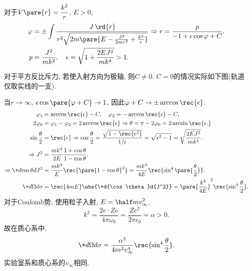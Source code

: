 \documentclass{ctexart}
\begin{document}
对于$\displaystyle V\pare{r} = \frac{k^2}{r}$, $E>0$,
\begin{align*}
    \varphi &= \pm \int \frac{J\,\rd{r}}{r^2\sqrt{2m\pare{E - \frac{J^2}{2mr^2} + \frac{k^2}{r}}}} \Rightarrow r = \frac{p}{-1 + \epsilon \cos\varphi + C}.\\
    p &= \frac{J^2}{mk^2},\quad \epsilon = \sqrt{1+\frac{2EJ^2}{mk^4}} > 1.
\end{align*}
\begin{remark}
    对于平方反比斥力, 若使入射方向为极轴, 则$C\neq 0$. $C=0$的情况实际如下图(轨道仅取实线的一支). 
    \begin{center}
    \end{center}
\end{remark}

当$r\rightarrow\infty$, $\epsilon\cos\pare{\varphi+C}\rightarrow 1$, 因此$\varphi+C \rightarrow \pm\displaystyle \arccos \rec{\epsilon}$.
\begin{align*}
    \varphi_1 &= \arccos \rec{\epsilon} - C,\quad \varphi_2 = -\arccos \rec{\epsilon} - C, \\
    2\varphi_0 &= \varphi_1 - \varphi_2 = 2\arccos \rec{\epsilon}\Rightarrow \theta = \pi - 2\varphi_0 = 2 \arcsin \rec{\epsilon.} \\
    \sin \frac{\theta}{2} &= \rec{\epsilon} \Rightarrow \cos \frac{\theta}{2} = \frac{\sqrt{1-\rec{\epsilon^2}}}{1/\epsilon} = \sqrt{\epsilon^2 - 1} = \sqrt{\frac{2EJ^2}{mk^4}}.\\
    \Rightarrow J^2 &= \frac{mk^4}{2E} \frac{1+\cos\theta}{1-\cos\theta}, \\
    \Rightarrow \+d{\cos\theta}d{J^2} &= \frac{mk^4}{E}\rec{\pare{1-\cos\theta}^2} = \frac{mk^4}{4E} \rec{\sin^4\pare{\frac{\theta}{2}}}. \\
    \+d\Omega d\sigma &= \rec{4mE}\abs{\+d{\cos\theta}d{J^2}} = \pare{\frac{k^4}{4E}}^2 \rec{\sin^4 \frac{\theta}{2}}.
\end{align*}
对于Coulomb势, 使用粒子入射, $\displaystyle E = \half mv_\infty^2$,
\[ k^2 = \frac{2e\cdot Ze}{4\pi\omega_0} = \frac{Ze^2}{2\pi \epsilon_0} = \alpha > 0. \]
故在质心系中,
\[ \+d\Omega d\sigma = \frac{\alpha^2}{4m^2v_\infty^4} \rec{\sin^4 \frac{\theta}{2}}. \]
实验室系和质心系的$v_\infty$相同.
\end{document}
